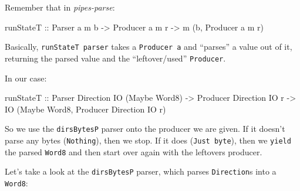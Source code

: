 \documentclass[]{article}
\newenvironment{Shaded}{}{}
\newcommand{\DataTypeTok}[1]{\textcolor[rgb]{0.56,0.13,0.00}{#1}}
\newcommand{\NormalTok}[1]{#1}
\newcommand{\OtherTok}[1]{\textcolor[rgb]{0.00,0.44,0.13}{#1}}
\begin{document}
Remember that in \emph{pipes-parse}:

\begin{Shaded}
\begin{Highlighting}[]
\OtherTok{runStateT ::} \DataTypeTok{Parser}\NormalTok{ a m b }\OtherTok{->} \DataTypeTok{Producer}\NormalTok{ a m r }\OtherTok{->}\NormalTok{ m (b, }\DataTypeTok{Producer}\NormalTok{ a m r)}
\end{Highlighting}
\end{Shaded}

Basically, \texttt{runStateT\ parser} takes a \texttt{Producer\ a} and
``parses'' a value out of it, returning the parsed value and the
``leftover/used'' \texttt{Producer}.

In our case:

\begin{Shaded}
\begin{Highlighting}[]
\OtherTok{runStateT ::} \DataTypeTok{Parser}   \DataTypeTok{Direction} \DataTypeTok{IO}\NormalTok{ (}\DataTypeTok{Maybe} \DataTypeTok{Word8}\NormalTok{)}
          \OtherTok{->} \DataTypeTok{Producer} \DataTypeTok{Direction} \DataTypeTok{IO}\NormalTok{ r}
          \OtherTok{->} \DataTypeTok{IO}\NormalTok{ (}\DataTypeTok{Maybe} \DataTypeTok{Word8}\NormalTok{, }\DataTypeTok{Producer} \DataTypeTok{Direction} \DataTypeTok{IO}\NormalTok{ r)}
\end{Highlighting}
\end{Shaded}

So we use the \texttt{dirsBytesP} parser onto the producer we are given. If it
doesn't parse any bytes (\texttt{Nothing}), then we stop. If it does
(\texttt{Just\ byte}), then we \texttt{yield} the parsed \texttt{Word8} and then
start over again with the leftovers producer.

Let's take a look at the \texttt{dirsBytesP} parser, which parses
\texttt{Direction}s into a \texttt{Word8}:
\end{document}
